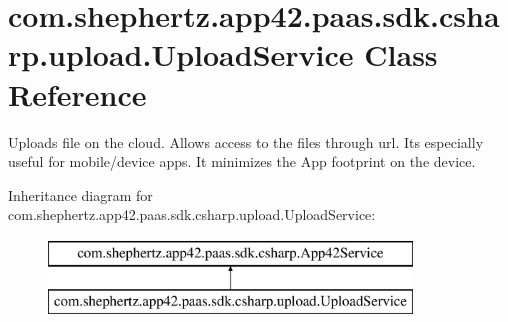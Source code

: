 \hypertarget{classcom_1_1shephertz_1_1app42_1_1paas_1_1sdk_1_1csharp_1_1upload_1_1_upload_service}{\section{com.\+shephertz.\+app42.\+paas.\+sdk.\+csharp.\+upload.\+Upload\+Service Class Reference}
\label{classcom_1_1shephertz_1_1app42_1_1paas_1_1sdk_1_1csharp_1_1upload_1_1_upload_service}
}


Uploads file on the cloud. Allows access to the files through url. Its especially useful for mobile/device apps. It minimizes the App footprint on the device.  


Inheritance diagram for com.\+shephertz.\+app42.\+paas.\+sdk.\+csharp.\+upload.\+Upload\+Service\+:\begin{figure}[H]
\begin{center}
\leavevmode
\includegraphics[height=2.000000cm]{classcom_1_1shephertz_1_1app42_1_1paas_1_1sdk_1_1csharp_1_1upload_1_1_upload_service}
\end{center}
\end{figure}
